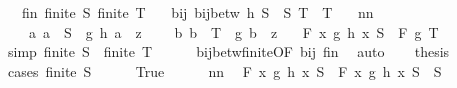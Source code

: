 \begin{isabellebody}
\ \ \ fin{\isacharcolon}{\kern0pt}\ {\isachardoublequoteopen}finite\ S{\isacharprime}{\kern0pt}{\isachardoublequoteclose}\ {\isachardoublequoteopen}finite\ T{\isacharprime}{\kern0pt}{\isachardoublequoteclose}\isanewline
\ \ \ bij{\isacharcolon}{\kern0pt}\ {\isachardoublequoteopen}bij{\isacharunderscore}{\kern0pt}betw\ h\ {\isacharparenleft}{\kern0pt}S\ {\isacharminus}{\kern0pt}\ S{\isacharprime}{\kern0pt}{\isacharparenright}{\kern0pt}\ {\isacharparenleft}{\kern0pt}T\ {\isacharminus}{\kern0pt}\ T{\isacharprime}{\kern0pt}{\isacharparenright}{\kern0pt}{\isachardoublequoteclose}\isanewline
\ \ \ nn{\isacharcolon}{\kern0pt}\isanewline
\ \ \ \ {\isachardoublequoteopen}{\isasymAnd}a{\isachardot}{\kern0pt}\ a\ {\isasymin}\ S{\isacharprime}{\kern0pt}\ {\isasymLongrightarrow}\ g\ {\isacharparenleft}{\kern0pt}h\ a{\isacharparenright}{\kern0pt}\ {\isacharequal}{\kern0pt}\ z{\isachardoublequoteclose}\isanewline
\ \ \ \ {\isachardoublequoteopen}{\isasymAnd}b{\isachardot}{\kern0pt}\ b\ {\isasymin}\ T{\isacharprime}{\kern0pt}\ {\isasymLongrightarrow}\ g\ b\ {\isacharequal}{\kern0pt}\ z{\isachardoublequoteclose}\isanewline
\ \ \ {\isachardoublequoteopen}F\ {\isacharparenleft}{\kern0pt}{\isasymlambda}x{\isachardot}{\kern0pt}\ g\ {\isacharparenleft}{\kern0pt}h\ x{\isacharparenright}{\kern0pt}{\isacharparenright}{\kern0pt}\ S\ {\isacharequal}{\kern0pt}\ F\ g\ T{\isachardoublequoteclose}\isanewline
%
\isadelimproof
%
\endisadelimproof
%
\isatagproof
{}\isamarkupfalse%
\ {\isacharminus}{\kern0pt}\isanewline
\ \ \isamarkupfalse%
\ {\isacharbrackleft}{\kern0pt}simp{\isacharbrackright}{\kern0pt}{\isacharcolon}{\kern0pt}\ {\isachardoublequoteopen}finite\ S\ {\isasymlongleftrightarrow}\ finite\ T{\isachardoublequoteclose}\isanewline
\ \ \ \ \isamarkupfalse%
\ bij{\isacharunderscore}{\kern0pt}betw{\isacharunderscore}{\kern0pt}finite{\isacharbrackleft}{\kern0pt}OF\ bij{\isacharbrackright}{\kern0pt}\ fin\ \isamarkupfalse%
\ auto\isanewline
\ \ \isamarkupfalse%
\ {\isacharquery}{\kern0pt}thesis\isanewline
\ \ \isamarkupfalse%
\ {\isacharparenleft}{\kern0pt}cases\ {\isachardoublequoteopen}finite\ S{\isachardoublequoteclose}{\isacharparenright}{\kern0pt}\isanewline
\ \ \ \ \isamarkupfalse%
\ True\isanewline
\ \ \ \ \isamarkupfalse%
\ nn\ \isamarkupfalse%
\ {\isachardoublequoteopen}F\ {\isacharparenleft}{\kern0pt}{\isasymlambda}x{\isachardot}{\kern0pt}\ g\ {\isacharparenleft}{\kern0pt}h\ x{\isacharparenright}{\kern0pt}{\isacharparenright}{\kern0pt}\ S\ {\isacharequal}{\kern0pt}\ F\ {\isacharparenleft}{\kern0pt}{\isasymlambda}x{\isachardot}{\kern0pt}\ g\ {\isacharparenleft}{\kern0pt}h\ x{\isacharparenright}{\kern0pt}{\isacharparenright}{\kern0pt}\ {\isacharparenleft}{\kern0pt}S\ {\isacharminus}{\kern0pt}\ S{\isacharprime}{\kern0pt}{\isacharparenright}{\kern0pt}{\isachardoublequoteclose}\isanewline

\end{isabellebody}
